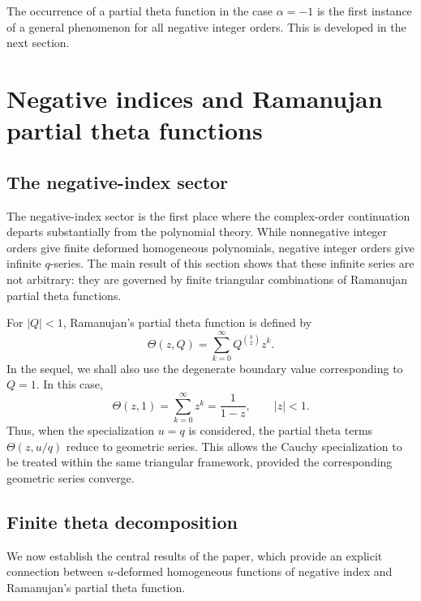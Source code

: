 \documentclass[12pt]{article}
\begin{document}
The occurrence of a partial theta function in the case \(\alpha=-1\) is the first instance of a general phenomenon for all negative integer orders. This is developed in the next section.

\section{Negative indices and Ramanujan partial theta functions}

\subsection{The negative-index sector}

The negative-index sector is the first place where the complex-order
continuation departs substantially from the polynomial theory. While
nonnegative integer orders give finite deformed homogeneous polynomials,
negative integer orders give infinite \(q\)-series. The main result of
this section shows that these infinite series are not arbitrary: they
are governed by finite triangular combinations of Ramanujan partial theta functions.

For \(|Q|<1\), Ramanujan's partial theta function is defined by \[ \Theta(z,Q)=\sum_{k=0}^{\infty}Q^{\binom{k}{2}}z^k. \] In the sequel, we shall also use the degenerate boundary value corresponding to \(Q=1\). In this case, \[ \Theta(z,1)=\sum_{k=0}^{\infty}z^k=\frac{1}{1-z}, \qquad |z|<1. \] Thus, when the specialization \(u=q\) is considered, the partial theta terms \(\Theta(z,u/q)\) reduce to geometric series. This allows the Cauchy specialization to be treated within the same triangular framework, provided the corresponding geometric series converge.

\subsection{Finite theta decomposition}

We now establish the central results of the paper, which provide an explicit connection between $u$‑deformed homogeneous functions of negative index and Ramanujan’s partial theta function.
\end{document}
